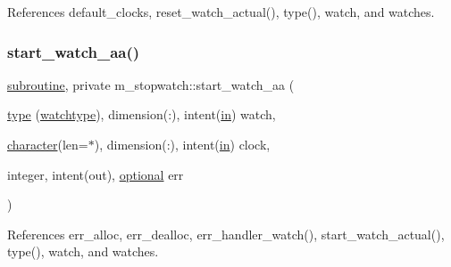 References default\+\_\+clocks, reset\+\_\+watch\+\_\+actual(), type(), watch, and watches.

\mbox{\label{namespacem__stopwatch_ab76844fff5eb77d00bf4db5516902414}} 
\subsubsection{\texorpdfstring{start\+\_\+watch\+\_\+aa()}{start\_watch\_aa()}}
{\footnotesize\ttfamily \hyperlink{M__stopwatch_83_8txt_acfbcff50169d691ff02d4a123ed70482}{subroutine}, private m\+\_\+stopwatch\+::start\+\_\+watch\+\_\+aa (\begin{DoxyParamCaption}\item[{\hyperlink{stop__watch_83_8txt_a70f0ead91c32e25323c03265aa302c1c}{type} (\hyperlink{structm__stopwatch_1_1watchtype}{watchtype}), dimension(\+:), intent(\hyperlink{M__journal_83_8txt_afce72651d1eed785a2132bee863b2f38}{in})}]{watch,  }\item[{\hyperlink{option__stopwatch_83_8txt_abd4b21fbbd175834027b5224bfe97e66}{character}(len=$\ast$), dimension(\+:), intent(\hyperlink{M__journal_83_8txt_afce72651d1eed785a2132bee863b2f38}{in})}]{clock,  }\item[{integer, intent(out), \hyperlink{option__stopwatch_83_8txt_aa4ece75e7acf58a4843f70fe18c3ade5}{optional}}]{err }\end{DoxyParamCaption})\hspace{0.3cm}{\ttfamily [private]}}



References err\+\_\+alloc, err\+\_\+dealloc, err\+\_\+handler\+\_\+watch(), start\+\_\+watch\+\_\+actual(), type(), watch, and watches.

\mbox{\label{namespacem__stopwatch_a80ef48faa6df7821de6ef06c0fa650fe}} 
